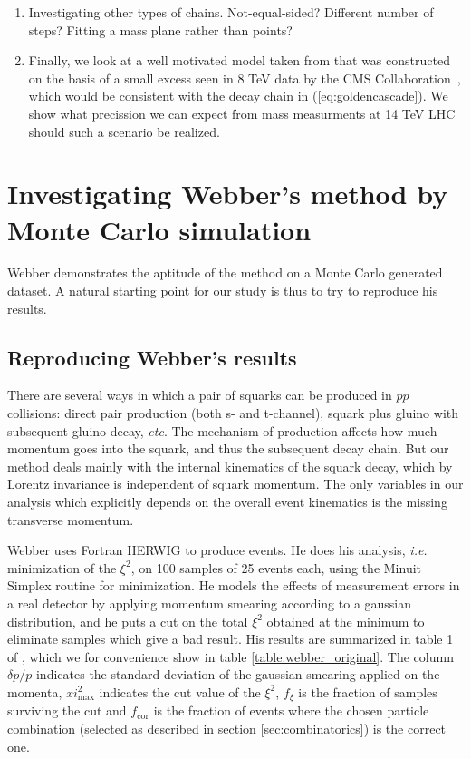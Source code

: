 \documentclass[twoside,english]{uiofysmaster}
\begin{document}
\begin{enumerate}
	\item Investigating other types of chains. Not-equal-sided? Different number of steps? Fitting a mass plane rather than points?
	\item Finally, we look at a well motivated model taken from \cite{Allanach:2014gsa} that was constructed on the basis of a small excess seen in 8 TeV data by the CMS Collaboration~\cite{CMS:2014jfa}, which would be consistent with the decay chain in (\ref{eq:goldencascade}). We show what precission we can expect from mass measurments at 14 TeV LHC should such a scenario be realized.
\end{enumerate}







\chapter{Investigating Webber's method by Monte Carlo simulation}
\label{ch:MC}
Webber demonstrates the aptitude of the method on a Monte Carlo generated dataset. A natural starting point for our study is thus to try to reproduce his results. 

\section{Reproducing Webber's results}
There are several ways in which a pair of squarks can be produced in $pp$ collisions: direct pair production (both s- and t-channel), squark plus gluino with subsequent gluino decay, {\it etc}. The mechanism of production affects how much momentum goes into the squark, and thus the subsequent decay chain. But our method deals mainly with the internal kinematics of the squark decay, which by Lorentz invariance is independent of squark momentum. The only variables in our analysis which explicitly depends on the overall event kinematics is the missing transverse momentum.

Webber uses Fortran HERWIG \cite{Corcella:2000bw} to produce events. He does his analysis, {\it i.e.} minimization of the $\xi^2$, on 100 samples of 25 events each, using the Minuit Simplex \cite{James:1975dr} routine for minimization. He models the effects of measurement errors in a real detector by applying momentum smearing according to a gaussian distribution, and he puts a cut on the total $\xi^2$ obtained at the minimum to eliminate samples which give a bad result. His results are summarized in table 1 of \cite{Webber:2009vm}, which we for convenience show in table \ref{table:webber_original}. The column $\delta p/p$ indicates the standard deviation of the gaussian smearing applied on the momenta, $xi^2_\mathrm{max}$ indicates the cut value of the $\xi^2$, $f_\xi$ is the fraction of samples surviving the cut and $f_\mathrm{cor}$ is the fraction of events where the chosen particle combination (selected as described in section \ref{sec:combinatorics}) is the correct one. 
\end{document}
